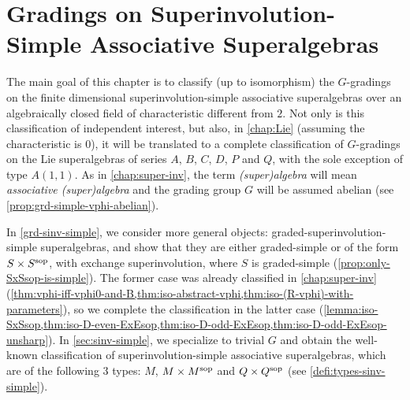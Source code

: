 \chapter[Gradings on Superinvolution-Simple Associative Superalgebras]
{Gradings on Superinvolution-\texorpdfstring{ }{}Simple Associative Superalgebras}\label{chap:grds-sinv-simple}

The main goal of this chapter is to classify (up to isomorphism) the $G$-gradings on the finite dimensional superinvolution-simple associative superalgebras over an algebraically closed field of characteristic different from $2$. 
Not only is
this classification of independent interest, but also, in \cref{chap:Lie} (assuming the characteristic is $0$), it will be translated to a complete classification of $G$-gradings on the Lie superalgebras of series $A$, $B$, $C$, $D$, $P$ and $Q$, with the sole exception of type $A(1,1)$. 
As in \cref{chap:super-inv}, the term \emph{(super)algebra} will mean \emph{associative (super)algebra} and the grading group $G$ will be assumed abelian (see \cref{prop:grd-simple-vphi-abelian}).

In \cref{grd-sinv-simple}, we consider more general objects: graded-superinvolution-simple superalgebras, and show that they are either graded-simple or of the form $S\times S^{\mathrm{sop}}$, with exchange superinvolution, where $S$ is graded-simple (\cref{prop:only-SxSsop-is-simple}). 
The former case was already classified in \cref{chap:super-inv} (\cref{thm:vphi-iff-vphi0-and-B,thm:iso-abstract-vphi,thm:iso-(R-vphi)-with-parameters}), so we complete the classification in the latter case (\cref{lemma:iso-SxSsop,thm:iso-D-even-ExEsop,thm:iso-D-odd-ExEsop,thm:iso-D-odd-ExEsop-unsharp}). 
In \cref{sec:sinv-simple}, we specialize to trivial $G$ and obtain the well-known classification of superinvolution-simple associative superalgebras, which are of the following $3$ types: $M$, $M\times M^{\mathrm{sop}}$ and $Q\times Q^{\mathrm{sop}}$ (see \cref{defi:types-sinv-simple}). 

